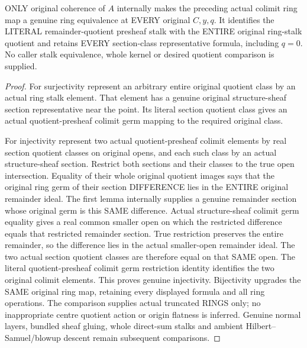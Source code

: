 \begin{theorem}
\label{hir:real-domain-actual-remainder-quotient-whole-ring-stalk-equivalence}
\leanok
ONLY original coherence of $A$ internally makes the preceding actual
colimit ring map a genuine ring equivalence at EVERY original $C,y,q$.
It identifies the LITERAL remainder-quotient presheaf stalk with the
ENTIRE original ring-stalk quotient and retains EVERY section-class
representative formula, including $q=0$. No caller stalk equivalence,
whole kernel or desired quotient comparison is supplied.
\end{theorem}
\begin{proof}
For surjectivity represent an arbitrary entire original quotient class
by an actual ring stalk element. That element has a genuine original
structure-sheaf section representative near the point. Its literal
section quotient class gives an actual quotient-presheaf colimit germ
mapping to the required original class.

For injectivity represent two actual quotient-presheaf colimit elements
by real section quotient classes on original opens, and each such class
by an actual structure-sheaf section. Restrict both sections and their
classes to the true open intersection. Equality of their whole original
quotient images says that the original ring germ of their section
DIFFERENCE lies in the ENTIRE original remainder ideal. The first lemma
internally supplies a genuine remainder section whose original germ is
this SAME difference. Actual structure-sheaf colimit germ equality gives
a real common smaller open on which the restricted difference equals
that restricted remainder section. True restriction preserves the
entire remainder, so the difference lies in the actual smaller-open
remainder ideal. The two actual section quotient classes are therefore
equal on that SAME open. The literal quotient-presheaf colimit germ
restriction identity identifies the two original colimit elements.
This proves genuine injectivity. Bijectivity upgrades the SAME original
ring map, retaining every displayed formula and all ring operations.
The comparison supplies actual truncated RINGS only; no inappropriate
centre quotient action or origin flatness is inferred. Genuine normal
layers, bundled sheaf gluing, whole direct-sum stalks and ambient
Hilbert--Samuel/blowup descent remain subsequent comparisons.
\end{proof}
